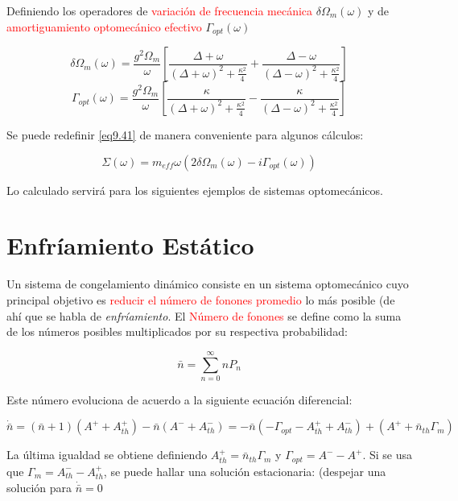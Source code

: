 \documentclass{book}
\begin{document}
Definiendo los operadores de \textcolor{red}{variación de frecuencia mecánica} $\delta\Omega_m(\omega)$ y de \textcolor{red}{amortiguamiento optomecánico efectivo} $\Gamma_{opt}(\omega)$

\begin{equation}\label{eq9.42}\delta\Omega_m(\omega)=\frac{g^2\Omega_m}{\omega}[\frac{\Delta+\omega}{(\Delta+\omega)^2+\frac{\kappa^2}{4}}+\frac{\Delta-\omega}{(\Delta-\omega)^2+\frac{\kappa^2}{4}}]\end{equation}
\begin{equation}\label{eq9.43}\Gamma_{opt}(\omega)=\frac{g^2\Omega_m}{\omega}[\frac{\kappa}{(\Delta+\omega)^2+\frac{\kappa^2}{4}}-\frac{\kappa}{(\Delta-\omega)^2+\frac{\kappa^2}{4}}]\end{equation}

Se puede redefinir \ref{eq9.41} de manera conveniente para algunos cálculos:

\begin{equation}\label{eq9.44}\Sigma(\omega)=m_{eff}\omega(2\delta\Omega_m(\omega)-i\Gamma_{opt}(\omega))\end{equation}

Lo calculado servirá para los siguientes ejemplos de sistemas optomecánicos.

\section{Enfríamiento Estático}

Un sistema de congelamiento dinámico consiste en un sistema optomecánico cuyo principal objetivo es \textcolor{red}{reducir el número de fonones promedio} lo más posible (de ahí que se habla de \textit{enfríamiento}. El \textcolor{red}{Número de fonones} se define como la suma de los números posibles multiplicados por su respectiva probabilidad:

\begin{equation}\label{eq9.45} \bar{n}=\sum_{n=0}^\infty nP_n \end{equation}

Este número evoluciona de acuerdo a la siguiente ecuación diferencial:

\begin{equation}\label{eq9.46}\dot{\bar{n}}=(\bar{n}+1)(A^++A^+_{th})-\bar{n}(A^-+A_{th}^-)=  -\bar{n}(-\Gamma_{opt}-A_{th}^++A_{th}^-)+(A^++\bar{n}_{th}\Gamma_m)\end{equation}

La última igualdad se obtiene definiendo $A_{th}^+=\bar{n}_{th}\Gamma_m$ y $\Gamma_{opt}=A^--A^+$. Si se usa que $\Gamma_m=A^-_{th}-A^+_{th}$, se puede hallar una solución estacionaria: (despejar una solución para $\dot{\bar{n}}=0$
\end{document}
